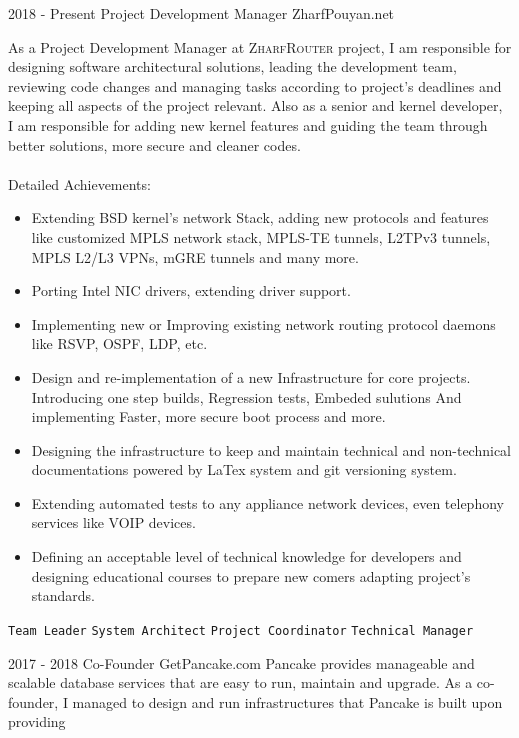 \documentclass[12pt]{developercv}
\begin{document}
\begin{entrylist}
	\entry
		{2018 - Present}
		{Project Development Manager}
		{ZharfPouyan.net}
		{
		As a Project Development Manager at \textsc{ZharfRouter} project,
		I am responsible for designing software architectural solutions,
		leading the development team, reviewing code changes and managing
		tasks according to project's deadlines and keeping all aspects of
		the project relevant. Also as a senior and kernel developer,
		I am responsible for adding new kernel features and guiding the
		team through better solutions, more secure and cleaner codes.
		\\
		\\
		Detailed Achievements:
		\begin{itemize}
			\item Extending BSD kernel's network Stack, adding new protocols
			      and features like customized MPLS network stack,
			      MPLS-TE tunnels, L2TPv3 tunnels, MPLS L2/L3 VPNs,
			      mGRE tunnels and many more.
			\item Porting Intel NIC drivers, extending driver support.
			\item Implementing new or Improving existing network routing
			      protocol daemons like RSVP, OSPF, LDP, etc.
			\item Design and re-implementation of a new Infrastructure for
				  core projects. Introducing one step builds, Regression tests,
				  Embeded sulutions And implementing Faster, more secure boot
				  process and more.
			\item Designing the infrastructure to keep and maintain technical and
				  non-technical documentations powered by LaTex system and
				  git versioning system.
			\item Extending automated tests to any appliance network devices,
				  even telephony services like VOIP devices.
			\item Defining an acceptable level of technical knowledge for
			      developers and designing educational courses to prepare
			      new comers adapting project's standards.
		\end{itemize}
		\texttt{Team Leader}\slashsep
		\texttt{System Architect}\slashsep
		\texttt{Project Coordinator}\slashsep
		\texttt{Technical Manager}
		}
	\entry
		{2017 - 2018}
		{Co-Founder}
		{GetPancake.com}
		{
		Pancake provides manageable and scalable database services that
		are easy to run, maintain and upgrade. As a co-founder, I managed
		to design and run infrastructures that Pancake is built upon providing
}
\end{entrylist}
\end{document}
